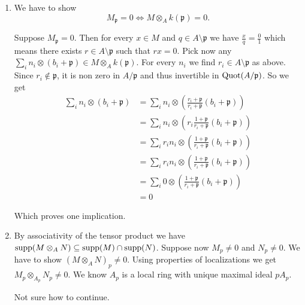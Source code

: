 \begin{exercise}{2}
    \begin{enumerate}
        \item We have to show
            \begin{equation}
                M_\mathfrak{p} = 0 \Longleftrightarrow M \otimes_A
                k(\mathfrak{p}) = 0.
            \end{equation}

            Suppose $M_\mathfrak{p} = 0$. Then for every $x \in M$ and $q \in A
            \setminus \mathfrak{p}$ we have $\frac{x}{q} = \frac{0}{1}$ which
            means there exists $r \in A \setminus \mathfrak{p}$ such that $r x =
            0$.
            Pick now any $\sum_i n_i \otimes (b_i + \mathfrak{p}) \in M \otimes_A
            k(\mathfrak{p})$. For every $n_i$ we find $r_i \in A \setminus
            \mathfrak{p}$ as above. Since $r_i \notin \mathfrak{p}$, it is non
            zero in $A / \mathfrak{p}$ and thus invertible in $\operatorname{Quot}(A /
            \mathfrak{p})$. So we get
            \begin{align*}
                \sum_i n_i \otimes (b_i  + \mathfrak{p}) &= 
                \sum_i n_i \otimes \left( \frac{r_i + \mathfrak{p}}{r_i +
                \mathfrak{p}}(b_i  + \mathfrak{p}) \right) \\
                &= \sum_i n_i \otimes \left( r_i \frac{1 + \mathfrak{p}}{r_i +
                \mathfrak{p}}(b_i  + \mathfrak{p}) \right) \\
                &= \sum_i r_i n_i \otimes \left( \frac{1 + \mathfrak{p}}{r_i +
                \mathfrak{p}}(b_i  + \mathfrak{p}) \right) \\
                &= \sum_i r_i n_i \otimes \left( \frac{1 + \mathfrak{p}}{r_i +
                \mathfrak{p}}(b_i  + \mathfrak{p}) \right) \\
                &= \sum_i 0 \otimes \left( \frac{1 + \mathfrak{p}}{r_i +
                \mathfrak{p}}(b_i  + \mathfrak{p}) \right) \\
                &= 0
            \end{align*}

            Which proves one implication.

        \item By associativity of the tensor product we have $\operatorname{supp}(M \otimes_A
            N) \subseteq \operatorname{supp}(M) \cap \operatorname{supp}(N)$. Suppose now $M_p \not= 0$ and
            $N_p \not= 0$. We have to show ${(M \otimes_A N)}_p \not= 0$. Using
            properties of localizations we get $M_p \otimes_{A_p} N_p \not= 0$.
            We know $A_p$ is a local ring with unique maximal ideal $p A_p$.

            Not sure how to continue.

    \end{enumerate}
\end{exercise}

